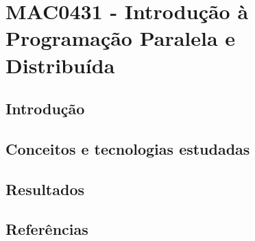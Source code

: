 \chapter{MAC0431 - Introdução à Programação Paralela e Distribuída}
\section{Introdução}
\section{Conceitos e tecnologias estudadas}
\section{Resultados}
\section{Referências}
